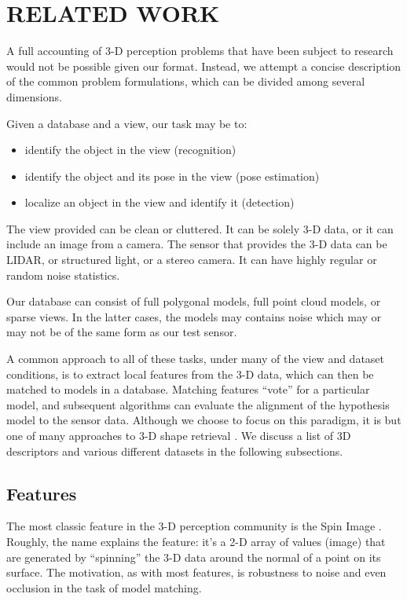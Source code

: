 \section{RELATED WORK}

A full accounting of 3-D perception problems that have been subject to research would not be possible given our format.
Instead, we attempt a concise description of the common problem formulations, which can be divided among several dimensions.

Given a database and a view, our task may be to:
\begin{itemize}
\item identify the object in the view (recognition)
\item identify the object and its pose in the view (pose estimation)
\item localize an object in the view and identify it (detection)
\end{itemize}

The view provided can be clean or cluttered.
It can be solely 3-D data, or it can include an image from a camera.
The sensor that provides the 3-D data can be LIDAR, or structured light, or a stereo camera.
It can have highly regular or random noise statistics.

Our database can consist of full polygonal models, full point cloud models, or sparse views.
In the latter cases, the models may contains noise which may or may not be of the same form as our test sensor.

A common approach to all of these tasks, under many of the view and dataset conditions, is to extract local features from the 3-D data, which can then be matched to models in a database.
Matching features ``vote'' for a particular model, and subsequent algorithms can evaluate the alignment of the hypothesis model to the sensor data.
Although we choose to focus on this paradigm, it is but one of many approaches to 3-D shape retrieval \cite{Tangelder2004}. We discuss a list of 3D descriptors and various different datasets in the following subsections.

\subsection{Features}
The most classic feature in the 3-D perception community is the Spin Image \cite{Johnson1999}.
Roughly, the name explains the feature: it's a 2-D array of values (image) that are generated by ``spinning'' the 3-D data around the normal of a point on its surface.
The motivation, as with most features, is robustness to noise and even occlusion in the task of model matching.

